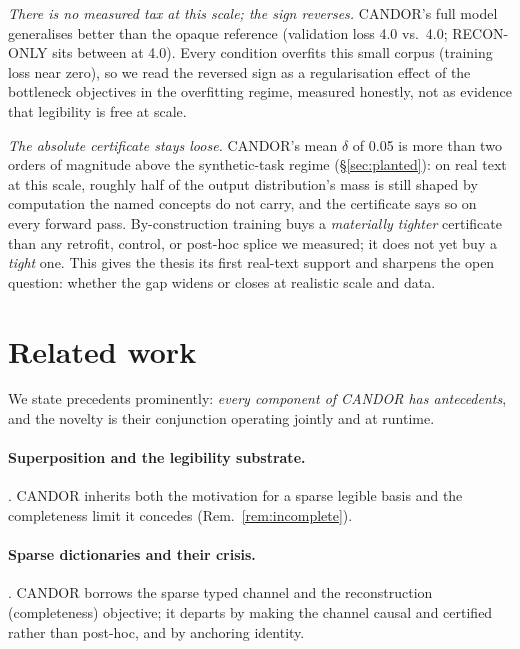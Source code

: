 \documentclass[11pt]{article}
\providecommand{\lmOpaqueLoss}{4.0}\providecommand{\lmOpaqueLossStd}{0.01}
\providecommand{\lmCandorDelta}{0.05}\providecommand{\lmCandorDeltaStd}{0.01}
\providecommand{\lmReconLoss}{4.0}\providecommand{\lmCandorLoss}{4.0}
\begin{document}
\emph{There is no measured tax at this scale; the sign reverses.} CANDOR's full
model generalises better than the opaque reference (validation loss \lmCandorLoss{}
vs.\ \lmOpaqueLoss; RECON-ONLY sits between at \lmReconLoss). Every condition
overfits this small corpus (training loss near zero), so we read the reversed sign
as a regularisation effect of the bottleneck objectives in the overfitting regime,
measured honestly, not as evidence that legibility is free at scale.

\emph{The absolute certificate stays loose.} CANDOR's mean $\delta$ of
\lmCandorDelta{} is more than two orders of magnitude above the synthetic-task
regime (\S\ref{sec:planted}): on real text at this scale, roughly half of the
output distribution's mass is still shaped by computation the named concepts do not
carry, and the certificate says so on every forward pass. By-construction training
buys a \emph{materially tighter} certificate than any retrofit, control, or post-hoc
splice we measured; it does not yet buy a \emph{tight} one. This gives the thesis
its first real-text support and sharpens the open question: whether the gap widens
or closes at realistic scale and data.

\section{Related work}
\label{sec:related}
We state precedents prominently: \emph{every component of CANDOR has antecedents}, and
the novelty is their conjunction operating jointly and at runtime.

\paragraph{Superposition and the legibility substrate.}
\citep{elhage2022superposition,elhage2021framework,olah2020zoomin,park2024linear,
hanni2024compsuperposition}. CANDOR inherits both the motivation for a sparse legible
basis and the completeness limit it concedes (Rem.~\ref{rem:incomplete}).

\paragraph{Sparse dictionaries and their crisis.}
\citep{bricken2023monosemanticity,cunningham2023sparse,templeton2024scaling,
gao2024scaling,rajamanoharan2024jumprelu,bussmann2025matryoshka,lieberum2024gemmascope,
chanin2024absorption,leask2025canonical,kantamneni2025useful}. CANDOR borrows the
sparse typed channel and the reconstruction (completeness) objective; it departs by
making the channel causal and certified rather than post-hoc, and by anchoring identity.
\end{document}
